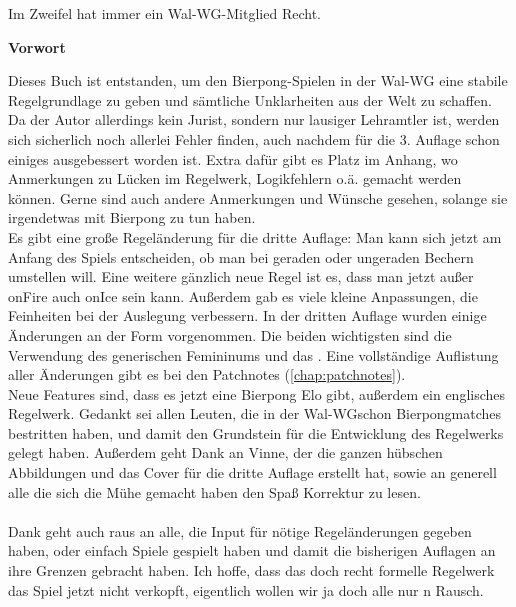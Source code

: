 \documentclass[a5paper, 12pt]{book}
\begin{document}
\begin{center}
\vspace*{2.5cm}
\par
\smallskip
\large{Im Zweifel hat immer ein Wal-WG\texttrademark-Mitglied Recht.}\label{Vorwort}
\end{center}
\restoregeometry
\pagebreak
\begin{Large} \textbf{Vorwort\\}
\end{Large}
Dieses Buch ist entstanden, um den Bierpong-Spielen in der Wal-WG eine stabile Regelgrundlage zu geben und sämtliche Unklarheiten aus der Welt zu schaffen. Da der Autor allerdings kein Jurist, sondern nur lausiger Lehramtler ist, werden sich sicherlich noch allerlei Fehler finden, auch nachdem für die 3. Auflage schon einiges ausgebessert worden ist. Extra dafür gibt es Platz im Anhang, wo Anmerkungen zu Lücken im Regelwerk, Logikfehlern o.ä. gemacht werden können. Gerne sind auch andere Anmerkungen und Wünsche gesehen, solange sie irgendetwas mit Bierpong zu tun haben.\\
Es gibt eine große Regeländerung für die dritte Auflage: Man kann sich jetzt am Anfang des Spiels entscheiden, ob man bei geraden oder ungeraden Bechern umstellen will. Eine weitere gänzlich neue Regel ist es, dass man jetzt außer onFire auch onIce sein kann. Außerdem gab es viele kleine Anpassungen, die Feinheiten bei der Auslegung verbessern.
In der dritten Auflage wurden einige Änderungen an der Form vorgenommen. Die beiden wichtigsten sind die Verwendung des generischen Femininums und das \texttrademark. Eine vollständige Auflistung aller Änderungen gibt es bei den Patchnotes (\ref{chap:patchnotes}).\\
Neue Features sind, dass es jetzt eine Bierpong Elo gibt, außerdem ein englisches Regelwerk.
Gedankt sei allen Leuten, die in der Wal-WG\texttrademark schon Bierpongmatches bestritten haben, und damit den Grundstein für die Entwicklung des Regelwerks gelegt haben. Außerdem geht Dank an Vinne, der die ganzen hübschen Abbildungen und das Cover für die dritte Auflage erstellt hat, sowie an generell alle die sich die Mühe gemacht haben den Spaß Korrektur zu lesen.\\\\
Dank geht auch raus an alle, die Input für nötige Regeländerungen gegeben haben, oder einfach Spiele gespielt haben und damit die bisherigen Auflagen an ihre Grenzen gebracht haben.
Ich hoffe, dass das doch recht formelle Regelwerk das Spiel jetzt nicht verkopft, eigentlich wollen wir ja doch alle nur n Rausch.
\end{document}
